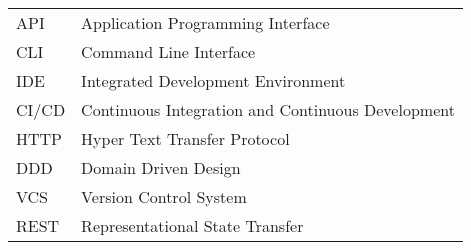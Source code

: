 \begin{longtable}{p{3cm}p{10cm}}
    API&Application Programming Interface\\
    CLI&Command Line Interface\\
    IDE&Integrated Development Environment\\
    CI/CD&Continuous Integration and Continuous Development\\
    HTTP&Hyper Text Transfer Protocol\\
    DDD&Domain Driven Design\\
    VCS&Version Control System\\
    REST&Representational State Transfer\\
\end{longtable}
\addtocounter{table}{-1}
